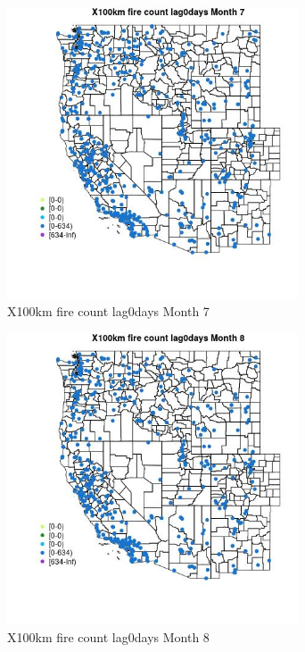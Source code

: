 \begin{figure} 
\centering  
\includegraphics[width=0.77\textwidth]{Code_Outputs/Report_ML_input_PM25_Step4_part_e_de_duplicated_aves_compiled_2019-05-14wNAs_MapObsMo7X100km_fire_count_lag0days.jpg} 
\caption{\label{fig:Report_ML_input_PM25_Step4_part_e_de_duplicated_aves_compiled_2019-05-14wNAsMapObsMo7X100km_fire_count_lag0days}X100km fire count lag0days Month 7} 
\end{figure} 
 

\begin{figure} 
\centering  
\includegraphics[width=0.77\textwidth]{Code_Outputs/Report_ML_input_PM25_Step4_part_e_de_duplicated_aves_compiled_2019-05-14wNAs_MapObsMo8X100km_fire_count_lag0days.jpg} 
\caption{\label{fig:Report_ML_input_PM25_Step4_part_e_de_duplicated_aves_compiled_2019-05-14wNAsMapObsMo8X100km_fire_count_lag0days}X100km fire count lag0days Month 8} 
\end{figure} 
 


